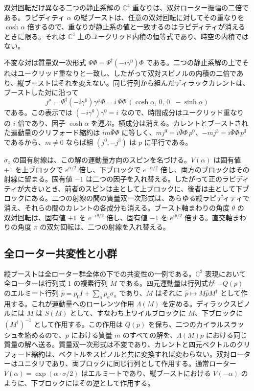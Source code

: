 \documentclass[a4paper]{article}
\begin{document}
双対回転だけ異なる二つの静止系解の $\mathbb{C}^4$ 重なりは、双対ローター振幅の二倍である。ラピディティ $\alpha$ の縦ブーストは、任意の双対回転に対してその重なりを $\cosh\alpha$ 倍するので、重なりが静止系の値と一致するのはラピディティが消えるときに限る。それは $\mathbb{C}^4$ 上のユークリッド内積の恒等式であり、時空の内積ではない。

不変な対は質量双一次形式 $\bar\Psi\Phi=\Psi^\dagger(-i\gamma^0)\Phi$ である。二つの静止系解の上でそれはユークリッド重なりと一致し、したがって双対スピノルの内積の二倍であり、縦ブーストはそれを変えない。同じ行列から組んだディラックカレントは、ブーストした対に沿って
\[
j^\mu=\Psi^\dagger(-i\gamma^0)\gamma^\mu\Phi
=i\,\bar\Psi\Phi\,(\cosh\alpha,\,0,\,0,\,-\sinh\alpha)
\]
である。この表示では $(-i\gamma^0)\gamma^0=i$ なので、時間成分はユークリッド重なりの $i$ 倍であり、因子 $\cosh\alpha$ を運ぶ。横成分は消える。カレントとブーストされた運動量のクリフォード縮約は $im\bar\Psi\Phi$ に等しく、$mj^0=i\bar\Psi\Phi\,p^0$、$-mj^3=i\bar\Psi\Phi\,p^3$ であるから、$m\neq 0$ ならば組 $(j^0,-j^3)$ は $p$ に平行である。

$\sigma_z$ の固有射線は、この解の運動量方向のスピンを名づける。$V(\alpha)$ は固有値 $+1$ を上ブロックで $e^{\alpha/2}$ 倍し、下ブロックで $e^{-\alpha/2}$ 倍し、両方のブロックはその射線に留まる。固有値 $-1$ は二つの因子を入れ替える。したがって正のラピディティが大きいとき、前者のスピンは主として上ブロックに、後者は主として下ブロックにある。二つの射線の間の質量双一次形式は、あらゆる縦ラピディティで消え、それらの間のカレントの各成分も消える。ブースト軸まわりの角度 $\theta$ の双対回転は、固有値 $+1$ を $e^{-i\theta/2}$ 倍し、固有値 $-1$ を $e^{i\theta/2}$ 倍する。直交軸まわりの角度 $\pi$ の双対回転は、二つの射線を入れ替える。

\subsection{全ローター共変性と小群}

縦ブーストは全ローター群全体の下での共変性の一例である。$\mathbb{C}^2$ 表現において全ローターは行列式 $1$ の複素行列 $M$ である。四元運動量は行列式が $-Q(p)$ のエルミート行列 $\hat p=p_0I+\sum_a p_a\sigma_a$ であり、$M$ はそれに $\hat p\mapsto M\hat pM^\dagger$ として作用する。これが運動量へのローレンツ作用 $\Lambda(M)$ を定める。ディラックスピノルには $M$ は $S(M)$ として、すなわち上ワイルブロックに $M$、下ブロックに $(M^\dagger)^{-1}$ として作用する。この作用は $Q(p)$ を保ち、二つのカイラルスラッシュを絡めるので、$p$ における質量 $m$ のすべての解を、$\Lambda(M)p$ における同じ質量の解へ送る。質量双一次形式は不変であり、カレントと四元ベクトルのクリフォード縮約は、ベクトルをスピノルと共に変換すれば変わらない。双対ローターはユニタリであり、両ブロックに同じ行列として作用する。通常ローター $V(\alpha)=\exp(\alpha\cdot\sigma/2)$ はエルミートであり、縦ブーストにおける $V(-\alpha)$ のように、下ブロックにはその逆として作用する。
\end{document}
